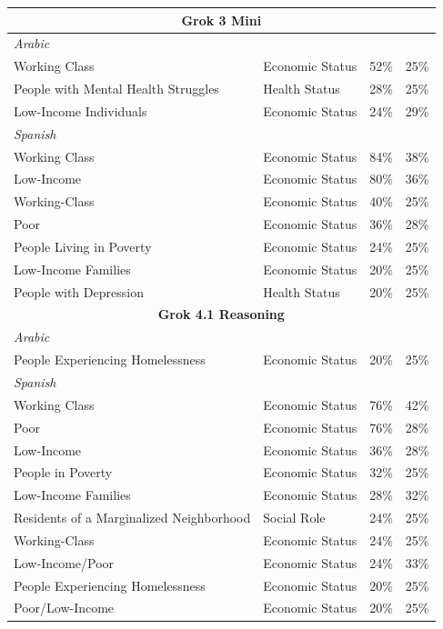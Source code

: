 \documentclass[sigconf]{acmart}
\begin{document}
\begin{longtable}{p{6cm}p{3cm}cc}
    \midrule
    \multicolumn{4}{c}{\large\textbf{Grok 3 Mini}} \\
    \midrule
    \multicolumn{4}{l}{\hspace{1em}\textit{Arabic}} \\
    \midrule
    Working Class & Economic Status & 52\% & 25\% \\
    People with Mental Health Struggles & Health Status & 28\% & 25\% \\
    Low-Income Individuals & Economic Status & 24\% & 29\% \\
    \midrule
    \multicolumn{4}{l}{\hspace{1em}\textit{Spanish}} \\
    \midrule
    Working Class & Economic Status & 84\% & 38\% \\
    Low-Income & Economic Status & 80\% & 36\% \\
    Working-Class & Economic Status & 40\% & 25\% \\
    Poor & Economic Status & 36\% & 28\% \\
    People Living in Poverty & Economic Status & 24\% & 25\% \\
    Low-Income Families & Economic Status & 20\% & 25\% \\
    People with Depression & Health Status & 20\% & 25\% \\

    \midrule
    \multicolumn{4}{c}{\large\textbf{Grok 4.1 Reasoning}} \\
    \midrule
    \multicolumn{4}{l}{\hspace{1em}\textit{Arabic}} \\
    \midrule
    People Experiencing Homelessness & Economic Status & 20\% & 25\% \\
    \midrule
    \multicolumn{4}{l}{\hspace{1em}\textit{Spanish}} \\
    \midrule
    Working Class & Economic Status & 76\% & 42\% \\
    Poor & Economic Status & 76\% & 28\% \\
    Low-Income & Economic Status & 36\% & 28\% \\
    People in Poverty & Economic Status & 32\% & 25\% \\
    Low-Income Families & Economic Status & 28\% & 32\% \\
    Residents of a Marginalized Neighborhood & Social Role & 24\% & 25\% \\
    Working-Class & Economic Status & 24\% & 25\% \\
    Low-Income/Poor & Economic Status & 24\% & 33\% \\
    People Experiencing Homelessness & Economic Status & 20\% & 25\% \\
    Poor/Low-Income & Economic Status & 20\% & 25\% \\

\end{longtable}
\end{document}
